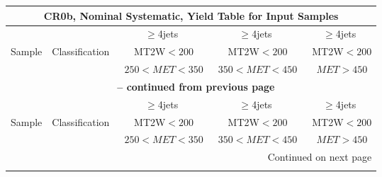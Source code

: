 \documentclass{article}
\begin{document}
\begin{longtable}{|l|c|c|c|c|} 
 
\multicolumn{5}{c}{ CR0b, Nominal Systematic, Yield Table for Input Samples }\\* \hline 
 &  & $\ge$4jets  & $\ge$4jets  & $\ge$4jets \\* 
Sample & Classification  & ~MT2W$<200$  & ~MT2W$<200$  & ~MT2W$<200$ \\* 
 &  & ~$250<MET<350$  & ~$350<MET<450$  & ~$MET>450$ \\* 
\hline \hline 
\endfirsthead 
 
\multicolumn{5}{c}{{\bfseries \tablename\ \thetable{} -- continued from previous page}}\\* \hline 
 &  & $\ge$4jets  & $\ge$4jets  & $\ge$4jets \\* 
Sample & Classification  & ~MT2W$<200$  & ~MT2W$<200$  & ~MT2W$<200$ \\* 
 &  & ~$250<MET<350$  & ~$350<MET<450$  & ~$MET>450$ \\* 
\hline \hline 
\endhead 
 
\multicolumn{5}{|r|}{{Continued on next page}}\\* \hline 
\endfoot 
 
 
\endlastfoot 
 

\end{longtable}
\end{document}
